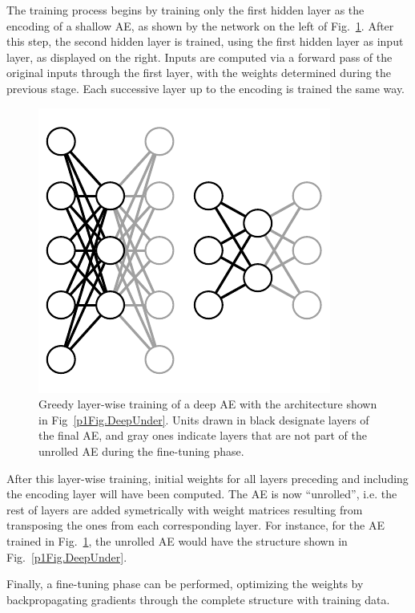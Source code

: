 The training process begins by training only the first hidden layer as the encoding of a shallow AE, as shown by the network on the left of Fig.~\ref{p1Fig.StackedAutoencoder}. After this step, the second hidden layer is trained, using the first hidden layer as input layer, as displayed on the right. Inputs are computed via a forward pass of the original inputs through the first layer, with the weights determined during the previous stage. Each successive layer up to the encoding is trained the same way.

\begin{figure}[ht!]
  \centering
  \includegraphics[width=.8\linewidth]{Stacked}
  \caption[Greedy layer-wise training of a deep AE.]{\label{p1Fig.StackedAutoencoder}Greedy layer-wise training of a deep AE with the architecture shown in Fig~\ref{p1Fig.DeepUnder}. Units drawn in black designate layers of the final AE, and gray ones indicate layers that are not part of the unrolled AE during the fine-tuning phase.}
\end{figure}

After this layer-wise training, initial weights for all layers preceding and including the encoding layer will have been computed. The AE is now ``unrolled'', i.e. the rest of layers are added symetrically with weight matrices resulting from transposing the ones from each corresponding layer. For instance, for the AE trained in Fig.~\ref{p1Fig.StackedAutoencoder}, the unrolled AE would have the structure shown in Fig.~\ref{p1Fig.DeepUnder}.

Finally, a fine-tuning phase can be performed, optimizing the weights by backpropagating gradients through the complete structure with training data.



